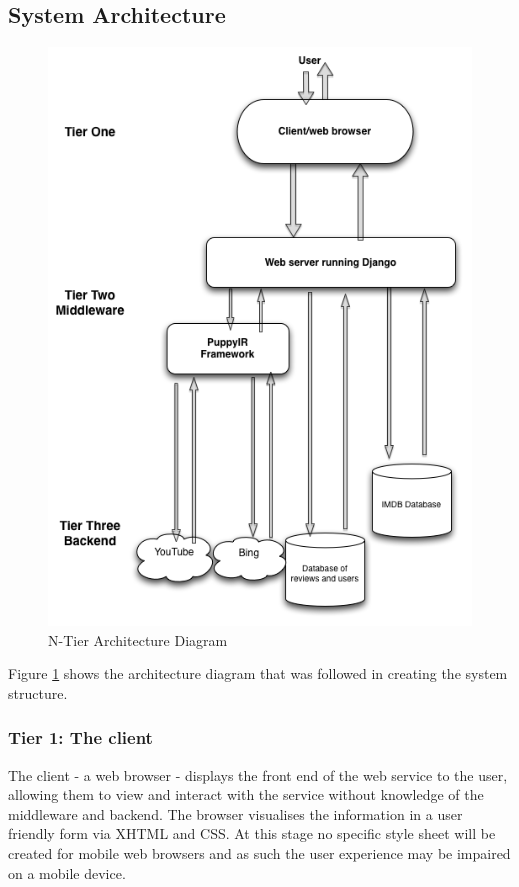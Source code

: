 \documentclass{sig-alt-release2}
\begin{document}
\subsection{System Architecture}
\begin{figure}[h]
\centering
\includegraphics[scale=0.475]{tier.png}
\caption{N-Tier Architecture Diagram}
\label{architecture}
\end{figure}

Figure \ref{architecture} shows the architecture diagram that was followed in creating the system structure.
 
\subsubsection*{Tier 1: The client}
 
The client - a web browser - displays the front end of the web service to the user, allowing them to view and interact with the service without knowledge of the middleware and backend. The browser visualises the information in a user friendly form via XHTML and CSS. At this stage no specific style sheet will be created for mobile web browsers and as such the user experience may be impaired on a mobile device. 
 
\end{document}
